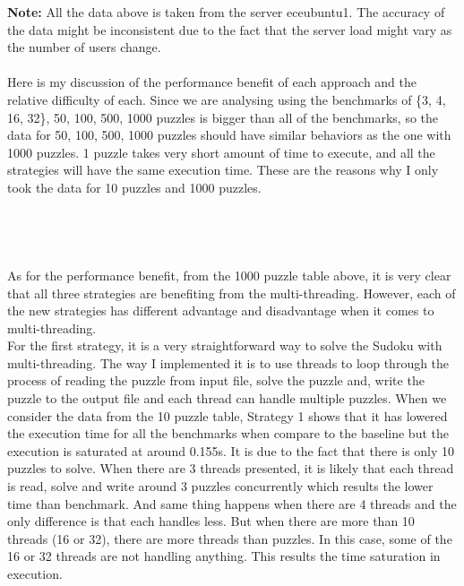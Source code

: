 \documentclass[12pt]{article}
\begin{document}
\textbf{Note:} All the data above is taken from the server eceubuntu1. The accuracy of the data might be inconsistent due to the fact that the server load might vary as the number of users change. \\ \\
\indent
Here is my discussion of the performance benefit of each approach and the relative difficulty of each. Since we are analysing using the benchmarks of \{3, 4, 16, 32\}, 50, 100, 500, 1000 puzzles is bigger than all of the benchmarks, so the data for 50, 100, 500, 1000 puzzles should have similar behaviors as the one with 1000 puzzles. 1 puzzle takes very short amount of time to execute, and all the strategies will have the same execution time. These are the reasons why I only took the data for 10 puzzles and 1000 puzzles. \\ \\ \\ \\ \\

As for the performance benefit, from the 1000 puzzle table above, it is very clear that all three strategies are benefiting from the multi-threading. However, each of the new strategies has different advantage and disadvantage when it comes to multi-threading. \\

For the first strategy, it is a very straightforward way to solve the Sudoku with multi-threading. The way I implemented it is to use threads to loop through the process of reading the puzzle from input file, solve the puzzle and, write the puzzle to the output file and each thread can handle multiple puzzles. When we consider the data from the 10 puzzle table, Strategy 1 shows that it has lowered the execution time for all the benchmarks when compare to the baseline but the execution is saturated at around 0.155s. It is due to the fact that there is only 10 puzzles to solve. When there are 3 threads presented, it is likely that each thread is read, solve and write around 3 puzzles concurrently which results the lower time than benchmark. And same thing happens when there are 4 threads and the only difference is that each handles less. But when there are more than 10 threads (16 or 32), there are more threads than puzzles. In this case, some of the 16 or 32 threads are not handling anything. This results the time saturation in execution. \\
\end{document}
